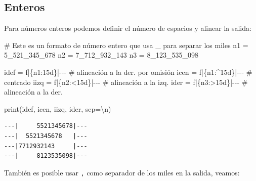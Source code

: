 \documentclass[
  spanish,
  letterpaper,
]{scrbook}
\newenvironment{Shaded}{\begin{snugshade}}{\end{snugshade}}
\newcommand{\BuiltInTok}[1]{\textcolor[rgb]{0.00,0.23,0.31}{#1}}
\newcommand{\CharTok}[1]{\textcolor[rgb]{0.13,0.47,0.30}{#1}}
\newcommand{\CommentTok}[1]{\textcolor[rgb]{0.37,0.37,0.37}{#1}}
\newcommand{\DecValTok}[1]{\textcolor[rgb]{0.68,0.00,0.00}{#1}}
\newcommand{\NormalTok}[1]{\textcolor[rgb]{0.00,0.23,0.31}{#1}}
\newcommand{\OperatorTok}[1]{\textcolor[rgb]{0.37,0.37,0.37}{#1}}
\newcommand{\SpecialCharTok}[1]{\textcolor[rgb]{0.37,0.37,0.37}{#1}}
\newcommand{\SpecialStringTok}[1]{\textcolor[rgb]{0.13,0.47,0.30}{#1}}
\newcommand{\StringTok}[1]{\textcolor[rgb]{0.13,0.47,0.30}{#1}}
\theoremstyle{definition}
\theoremstyle{remark}
\begin{document}
\subsection{Enteros}\label{enteros}

Para números enteros podemos definir el número de espacios y alinear la
salida:

\begin{Shaded}
\begin{Highlighting}[]
\CommentTok{\# Este es un formato de número entero que usa \_ para separar los miles}
\NormalTok{n1 }\OperatorTok{=} \DecValTok{5\_521\_345\_678}
\NormalTok{n2 }\OperatorTok{=} \DecValTok{7\_712\_932\_143}
\NormalTok{n3 }\OperatorTok{=} \DecValTok{8\_123\_535\_098}

\NormalTok{idef }\OperatorTok{=} \SpecialStringTok{f\textquotesingle{}{-}{-}{-}|}\SpecialCharTok{\{}\NormalTok{n1}\SpecialCharTok{:15d\}}\SpecialStringTok{|{-}{-}{-}\textquotesingle{}}  \CommentTok{\# alineación a la der. por omisión}
\NormalTok{icen }\OperatorTok{=} \SpecialStringTok{f\textquotesingle{}{-}{-}{-}|}\SpecialCharTok{\{}\NormalTok{n1}\SpecialCharTok{:\^{}15d\}}\SpecialStringTok{|{-}{-}{-}\textquotesingle{}} \CommentTok{\# centrado}
\NormalTok{iizq }\OperatorTok{=} \SpecialStringTok{f\textquotesingle{}{-}{-}{-}|}\SpecialCharTok{\{}\NormalTok{n2}\SpecialCharTok{:\textless{}15d\}}\SpecialStringTok{|{-}{-}{-}\textquotesingle{}} \CommentTok{\# alineación a la izq.}
\NormalTok{ider }\OperatorTok{=} \SpecialStringTok{f\textquotesingle{}{-}{-}{-}|}\SpecialCharTok{\{}\NormalTok{n3}\SpecialCharTok{:\textgreater{}15d\}}\SpecialStringTok{|{-}{-}{-}\textquotesingle{}} \CommentTok{\# alineación a la der.}

\BuiltInTok{print}\NormalTok{(idef, icen, iizq, ider, sep}\OperatorTok{=}\StringTok{\textquotesingle{}}\CharTok{\textbackslash{}n}\StringTok{\textquotesingle{}}\NormalTok{)}
\end{Highlighting}
\end{Shaded}

\begin{verbatim}
---|     5521345678|---
---|  5521345678   |---
---|7712932143     |---
---|     8123535098|---
\end{verbatim}

También es posible usar \texttt{,} como separador de los miles en la
salida, veamos:
\end{document}

